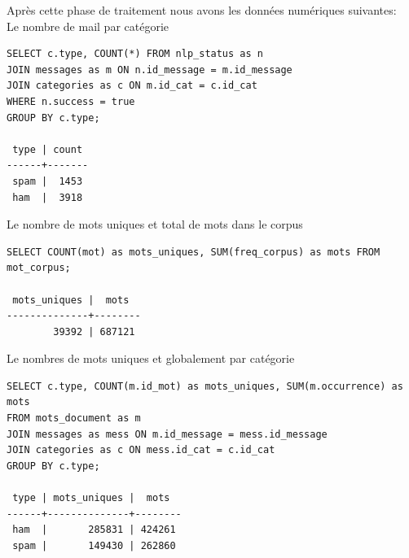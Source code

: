 \documentclass[a4paper,12pt]{article}
\begin{document}
			Après cette phase de traitement nous avons les données numériques suivantes:\\
			
			Le nombre de mail par catégorie
			\begin{verbatim}
SELECT c.type, COUNT(*) FROM nlp_status as n
JOIN messages as m ON n.id_message = m.id_message
JOIN categories as c ON m.id_cat = c.id_cat
WHERE n.success = true
GROUP BY c.type;

 type | count 
------+-------
 spam |  1453
 ham  |  3918
			\end{verbatim}
			
			Le nombre de mots uniques et total de mots dans le corpus
			\begin{verbatim}
SELECT COUNT(mot) as mots_uniques, SUM(freq_corpus) as mots FROM mot_corpus;

 mots_uniques |  mots  
--------------+--------
        39392 | 687121
			\end{verbatim}
			
			Le nombres de mots uniques et globalement par catégorie
			\begin{verbatim}
SELECT c.type, COUNT(m.id_mot) as mots_uniques, SUM(m.occurrence) as mots
FROM mots_document as m
JOIN messages as mess ON m.id_message = mess.id_message
JOIN categories as c ON mess.id_cat = c.id_cat
GROUP BY c.type;

 type | mots_uniques |  mots   
------+--------------+--------
 ham  |       285831 | 424261
 spam |       149430 | 262860
			\end{verbatim}
			
\end{document}
